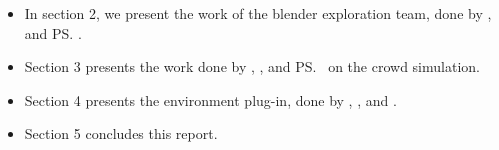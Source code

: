 \begin{itemize}
  \item In section 2, we present the work of the blender exploration team, done by \mr, \me and \ps.
  \item Section 3 presents the work done by \dl, \vl,
\js and \ps \ on the crowd simulation.
 \item Section 4 presents the environment
plug-in, done by \bb, \gc, \mr and \me.
 \item Section 5 concludes this report.
\end{itemize}

  
